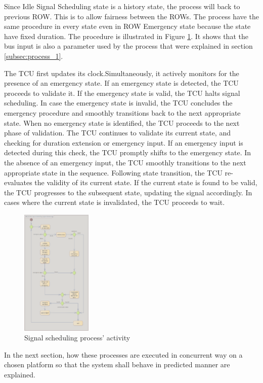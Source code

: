 Since Idle Signal Scheduling state is a history state, the process will back to previous ROW. This is to allow fairness between the ROWs. The process have the same procedure in every state even in ROW Emergency state because the state have fixed duration. The procedure is illustrated in Figure \ref{img:process_3_activity}. It shows that the bus input is also a parameter used by the process that were explained in section \ref{subsec:process_1}.

The TCU first updates its clock.Simultaneously, it actively monitors for the presence of an emergency state. If an emergency state is detected, the TCU proceeds to validate it. If the emergency state is valid, the TCU halts signal scheduling. In case the emergency state is invalid, the TCU concludes the emergency procedure and smoothly transitions back to the next appropriate state. When no emergency state is identified, the TCU proceeds to the next phase of validation. The TCU continues to validate its current state, and checking for duration extension or emergency input. If an emergency input is detected during this check, the TCU promptly shifts to the emergency state. In the absence of an emergency input, the TCU smoothly transitions to the next appropriate state in the sequence.
Following state transition, the TCU re-evaluates the validity of its current state. If the current state is found to be valid, the TCU progresses to the subsequent state, updating the signal accordingly. In cases where the current state is invalidated, the TCU proceeds to wait.
\begin{figure}[h]
    \centering
    \includegraphics[width=0.3\textwidth]{images/process_3_activity.png}
    \caption{Signal scheduling process’ activity }
    \label{img:process_3_activity}
\end{figure}

In the next section, how these processes are executed in concurrent way on a chosen platform so that the system shall behave in predicted manner are explained.
